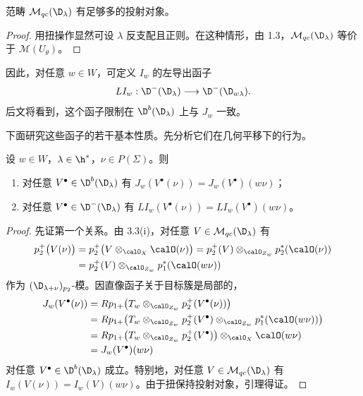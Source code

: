 \begin{lemma}\label{lem:03.3.4}
范畴 $\mathcal{M}_{qc}(\D_\lambda)$ 有足够多的投射对象。
\end{lemma}

\begin{proof}
用扭操作显然可设 $\lambda$ 反支配且正则。在这种情形，由 1.3，$\mathcal{M}_{qc}(\D_\lambda)$ 等价于 $\mathcal{M}(U_\theta)$。
\end{proof}

因此，对任意 $w\in W$，可定义 $I_w$ 的左导出函子
$$LI_w:\D^-(\D_\lambda)\longrightarrow\D^-(\D_{w\lambda}).$$
后文将看到，这个函子限制在 $\D^b(\D_\lambda)$ 上与 $J_w$ 一致。

下面研究这些函子的若干基本性质。先分析它们在几何平移下的行为。

\begin{lemma}\label{lem:03.3.5}
设 $w\in W$，$\lambda\in\h^*$，$\nu\in P(\Sigma)$。则
\begin{enumerate}[label=(\roman*),leftmargin=2.2em,itemsep=0pt,topsep=2pt]
\item 对任意 $V^\bullet\in\D^b(\D_\lambda)$ 有 $J_w(V^\bullet(\nu))=J_w(V^\bullet)(w\nu)$；
\item 对任意 $V^\bullet\in\D^-(\D_\lambda)$ 有 $LI_w(V^\bullet(\nu))=LI_w(V^\bullet)(w\nu)$。
\end{enumerate}
\end{lemma}

\begin{proof}
先证第一个关系。由 3.3(i)，对任意 $V\in\mathcal{M}_{qc}(\D_\lambda)$ 有
\begin{align*}
p_2^+\bigl(V(\nu)\bigr)&=p_2^+\bigl(V\otimes_{\calO_X}\calO(\nu)\bigr)
=p_2^+(V)\otimes_{\calO_{Z_w}}p_2^*(\calO(\nu))\\
&=p_2^+(V)\otimes_{\calO_{Z_w}}p_1^*(\calO(w\nu))
\end{align*}
作为 $(\D_{\lambda+\nu})_{p_2}$-模。因直像函子关于目标簇是局部的，
\begin{align*}
J_w(V^\bullet(\nu))&=Rp_{1+}\bigl(T_w\otimes_{\calO_{Z_w}}p_2^+(V^\bullet(\nu))\bigr)\\
&=Rp_{1+}\bigl(T_w\otimes_{\calO_{Z_w}}p_2^+(V^\bullet)\otimes_{\calO_{Z_w}}p_1^*(\calO(w\nu))\bigr)\\
&=Rp_{1+}\bigl(T_w\otimes_{\calO_{Z_w}}p_2^+(V^\bullet)\bigr)\otimes_{\calO_X}\calO(w\nu)\\
&=J_w(V^\bullet)(w\nu)
\end{align*}
对任意 $V^\bullet\in\D^b(\D_\lambda)$ 成立。特别地，对任意 $V\in\mathcal{M}_{qc}(\D_\lambda)$ 有 $I_w(V(\nu))=I_w(V)(w\nu)$。由于扭保持投射对象，引理得证。
\end{proof}

